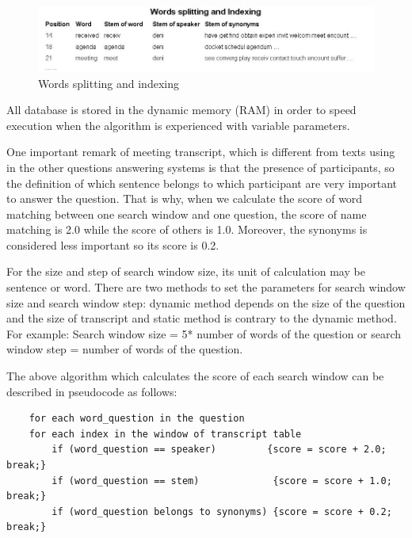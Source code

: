 \documentclass[12pt, a4paper]{report}
\begin{document}
\begin{figure}[htbp]
\centering
\includegraphics[scale = 0.7]{index.jpg}
\caption{Words splitting and indexing}\label{fig1}
\end{figure}

All database is stored in the dynamic memory (RAM) in order to speed execution when the algorithm is experienced with variable parameters.

One important remark of meeting transcript, which is different from texts using in the other questions answering systems is that the presence of participants, so the definition of which sentence belongs to which participant are very important to answer the question. That is why, when we calculate the score of word matching between one search window and one question, the score of name matching is 2.0 while the score of others is 1.0. Moreover, the synonyms is considered less important so its score is 0.2. 

For the size and step of search window size, its unit of calculation may be sentence or word. There are two methods to set the parameters for search window size and search window step: dynamic method depends on the size of the question and the size of transcript and static method  is contrary to the dynamic method. For example:  Search window size = 5* number of words of the question or  search window step = number of words of the question.


The above algorithm which calculates the score of each search window can be described in pseudocode as follows:
\small
\begin{verbatim}
	for each word_question in the question
	for each index in the window of transcript table
		if (word_question == speaker)         {score = score + 2.0; break;}
		if (word_question == stem)             {score = score + 1.0; break;}	
		if (word_question belongs to synonyms) {score = score + 0.2; break;}
\end{verbatim}
\normalsize		
		
\end{document}
